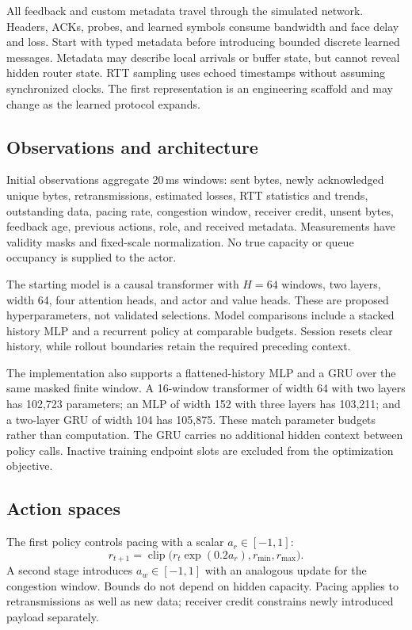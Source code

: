 \documentclass[11pt]{article}
\begin{document}
All feedback and custom metadata travel through the simulated network. Headers,
ACKs, probes, and learned symbols consume bandwidth and face delay and loss.
Start with typed metadata before introducing bounded discrete learned messages.
Metadata may describe local arrivals or buffer state, but cannot reveal hidden
router state. RTT sampling uses echoed timestamps without assuming synchronized
clocks. The first representation is an engineering scaffold and may change as
the learned protocol expands.

\subsection{Observations and architecture}
Initial observations aggregate 20\,ms windows: sent bytes, newly acknowledged
unique bytes, retransmissions, estimated losses, RTT statistics and trends,
outstanding data, pacing rate, congestion window, receiver credit, unsent bytes,
feedback age, previous actions, role, and received metadata. Measurements have
validity masks and fixed-scale normalization. No true capacity or queue occupancy
is supplied to the actor.

The starting model is a causal transformer with $H=64$ windows, two layers,
width 64, four attention heads, and actor and value heads. These are proposed
hyperparameters, not validated selections. Model comparisons include a stacked
history MLP and a recurrent policy at comparable budgets. Session resets clear
history, while rollout boundaries retain the required preceding context.

The implementation also supports a flattened-history MLP and a GRU over the same
masked finite window. A 16-window transformer of width 64 with two layers has
102,723 parameters; an MLP of width 152 with three layers has 103,211; and a
two-layer GRU of width 104 has 105,875. These match parameter budgets rather than
computation. The GRU carries no additional hidden context between policy calls.
Inactive training endpoint slots are excluded from the optimization objective.

\subsection{Action spaces}
The first policy controls pacing with a scalar $a_r\in[-1,1]$:
\begin{equation}
 r_{t+1}=\operatorname{clip}\bigl(r_t\exp(0.2a_r),r_{\min},r_{\max}\bigr).
\end{equation}
A second stage introduces $a_w\in[-1,1]$ with an analogous update for the
congestion window. Bounds do not depend on hidden capacity. Pacing applies to
retransmissions as well as new data; receiver credit constrains newly introduced
payload separately.
\end{document}
